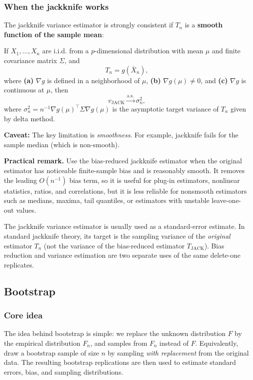 \subsubsection{When the jackknife works}
The jackknife variance estimator is strongly consistent if $T_n$ is a \textbf{smooth function of the sample mean}:

If $X_1,\ldots,X_n$ are i.i.d. from a $p$-dimensional distribution with mean $\mu$ and finite covariance matrix $\Sigma$, and
\[
    T_n=g(\bar X_n),
\]
where \textbf{(a)} $\nabla g$ is defined in a neighborhood of $\mu$, \textbf{(b)} $\nabla g(\mu)\ne 0$, and \textbf{(c)} $\nabla g$ is continuous at $\mu$, then
\[
    v_{\mathrm{JACK}} \stackrel{\mathrm{a.s.}}{\rightarrow} \sigma_n^2,
\]
where $\sigma_n^2=n^{-1}\nabla g(\mu)^\top\Sigma\nabla g(\mu)$ is the asymptotic target variance of $T_n$ given by delta method.

\textbf{Caveat:} The key limitation is \emph{smoothness}. For example, jackknife fails for the sample median (which is non-smooth).

\begin{mdframed}[skipabove=0pt,skipbelow=10pt,nobreak=true]
\textbf{Practical remark.}
Use the bias-reduced jackknife estimator when the original estimator has noticeable finite-sample bias and is reasonably smooth. It removes the leading $O(n^{-1})$ bias term, so it is useful for plug-in estimators, nonlinear statistics, ratios, and correlations, but it is less reliable for nonsmooth estimators such as medians, maxima, tail quantiles, or estimators with unstable leave-one-out values.

The jackknife variance estimator is usually used as a standard-error estimate. In standard jackknife theory, its target is the sampling variance of the \emph{original} estimator $T_n$ (not the variance of the bias-reduced estimator $T_{\mathrm{JACK}}$). Bias reduction and variance estimation are two separate uses of the same delete-one replicates.
\end{mdframed}


\subsection{Bootstrap}
\subsubsection{Core idea}
The idea behind bootstrap is simple: we replace the unknown distribution $F$ by the empirical distribution $F_n$, and samples from $F_n$ instead of $F$. Equivalently, draw a bootstrap sample of size $n$ by sampling \emph{with replacement} from the original data. The resulting bootstrap replications are then used to estimate standard errors, bias, and sampling distributions.

